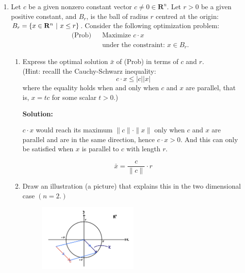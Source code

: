 \documentclass[12pt]{article}
\newenvironment{solution}
  {\par\noindent\textbf{Solution:}\par}
  {\par}
\begin{document}
\begin{enumerate}
  \pagebreak
\item Let $c$ be a given nonzero constant vector $c \neq 0 \in \mathbf{R}^n$. Let $r > 0$ be a given positive
  constant, and $B_r$, is the ball of radius $r$ centred at the origin: $B_r = \{x \in \mathbf{R}^n \hspace{.05in} \vert \hspace{.05in} x\le r\} $.
  Consider the following optimization problem:
    \begin{align*}
        &\text{(Prob)} && \text{Maximize }  c \cdot x \\
        & && \text{under the constraint: } x \in B_r.
    \end{align*}
    \begin{enumerate}[label=\alph*.]
      \item Express the optimal solution $\bar{x}$ of (Prob) in terms of $c$ and $r$. \\ (Hint: recalll the Cauchy-Schwarz inequality: $$c \cdot x \le \vert c \vert \vert x \vert$$ where the equality holds when and only when $c$ and $x$ are parallel, that is, $x=tc$ for some scalar $t >0 $.)
        \begin{solution}
          $c \cdot x$ would reach its maximum $\| c \|\cdot \| x \|$ only when $c$ and $x$ are parallel and are in the same direction, hence $c \cdot x > 0$. And this can only be satisfied when $x$ is parallel to $c$ with length $r$.

          $$\bar{x} = \frac{c}{\| c \|} \cdot r$$
        \end{solution}
      \item Draw an illustration (a picture) that explains this in the two dimensional case $(n=2.)$
           \begin{figure}[H]
        \centering
        \includegraphics[width=0.5\textwidth]{figure2.png} 
      \end{figure}

    \end{enumerate}


\end{enumerate}
\end{document}
